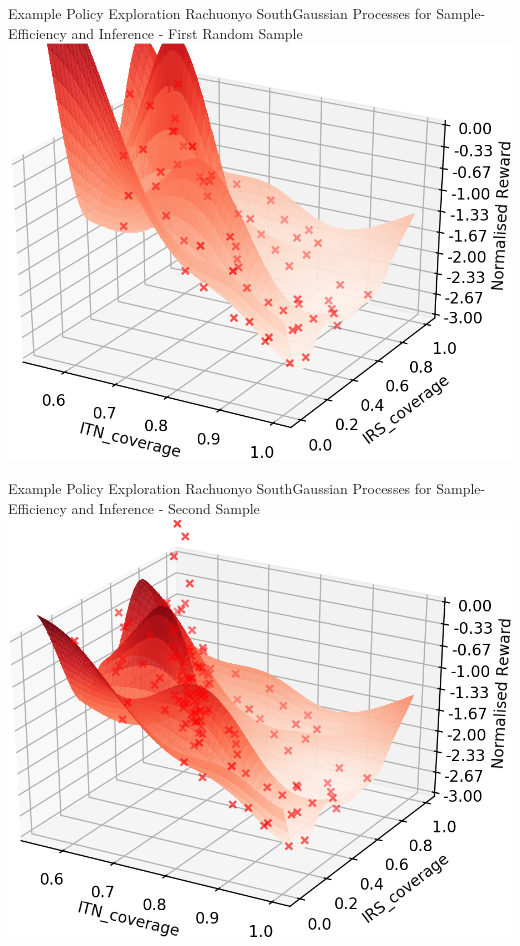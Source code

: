 \documentclass[10pt,usenames,dvipsnames]{beamer}
\begin{document}
\begin{frame}{Example Policy Exploration Rachuonyo South}{Gaussian Processes for Sample-Efficiency and Inference - First Random Sample}
\centering
\includegraphics[width=1\textheight]{images/Batch_1.png}
\end{frame}
\begin{frame}{Example Policy Exploration Rachuonyo South}{Gaussian Processes for Sample-Efficiency and Inference - Second Sample}
\centering
\includegraphics[width=1\textheight]{images/Batch_2.png}
\end{frame}
\end{document}
